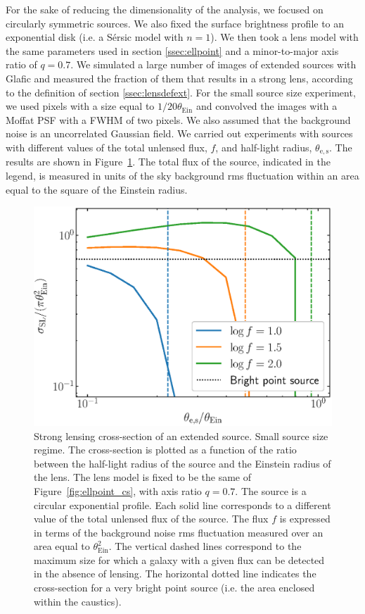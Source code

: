 \documentclass{aa}
\def\tein{\theta_{\mathrm{Ein}}}
\def\Fref#1{Figure~\ref{#1}\xspace}
\begin{document}
For the sake of reducing the dimensionality of the analysis, we focused on circularly symmetric sources. We also fixed the surface brightness profile to an exponential disk (i.e. a S\'{e}rsic model with $n=1$).
We then took a lens model with the same parameters used in section \ref{ssec:ellpoint} and a minor-to-major axis ratio of $q=0.7$.
We simulated a large number of images of extended sources with {\sc Glafic} and measured the fraction of them that results in a strong lens, according to the definition of section \ref{ssec:lensdefext}.
For the small source size experiment, we used pixels with a size equal to $1/20\tein$ and convolved the images with a Moffat PSF with a FWHM of two pixels.
We also assumed that the background noise is an uncorrelated Gaussian field.
We carried out experiments with sources with different values of the total unlensed flux, $f$, and half-light radius, $\theta_{\mathrm{e,s}}$.
The results are shown in \Fref{fig:extcs}.
The total flux of the source, indicated in the legend, is measured in units of the sky background rms fluctuation within an area equal to the square of the Einstein radius.

\begin{figure}
\includegraphics[width=\columnwidth]{ell_ext_cs.eps}
\caption{
Strong lensing cross-section of an extended source.
Small source size regime.
The cross-section is plotted as a function of the ratio between the half-light radius of the source and the Einstein radius of the lens.
The lens model is fixed to be the same of \Fref{fig:ellpoint_cs}, with axis ratio $q=0.7$. The source is a circular exponential profile.
Each solid line corresponds to a different value of the total unlensed flux of the source. The flux $f$ is expressed in terms of the background noise rms fluctuation measured over an area equal to $\tein^2$.
The vertical dashed lines correspond to the maximum size for which a galaxy with a given flux can be detected in the absence of lensing.
The horizontal dotted line indicates the cross-section for a very bright point source (i.e. the area enclosed within the caustics).
\label{fig:extcs}
}
\end{figure}
\end{document}
